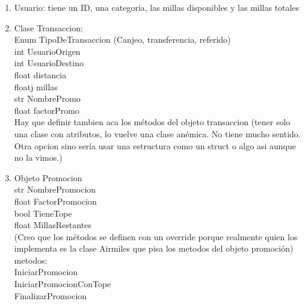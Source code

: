 \documentclass[11pt,a4paper]{article}
\begin{document}
\begin{enumerate}
	\item Usuario: tiene un ID, una categoria, las millas disponibles y las millas totales
	\item Clase Transaccion: \\
	Enum TipoDeTransaccion (Canjeo, transferencia, referido) \\
	int UsuarioOrigen \\
	int UsuarioDestino \\
	float distancia \\ 
	floatj millas \\
	str NombrePromo \\
	float factorPromo \\

	Hay que definir tambien aca los métodos del objeto transaccion (tener solo una clase con atributos, lo vuelve una clase anémica. No tiene mucho sentido. Otra opcion sino sería usar una estructura como un struct o algo asi aunque no la vimos.)

	\item Objeto Promocion \\
	str NombrePromocion \\
	float FactorPromocion \\
	bool TieneTope \\
	float MillasRestantes \\
	
	(Creo que los métodos se definen con un override porque realmente quien los implementa es la clase Airmiles que pisa los metodos del objeto promoción) \\
	metodos: \\
	IniciarPromocion \\
	IniciarPromocionConTope \\
	FinalizarPromocion \\
	
\end{enumerate}
\end{document}

